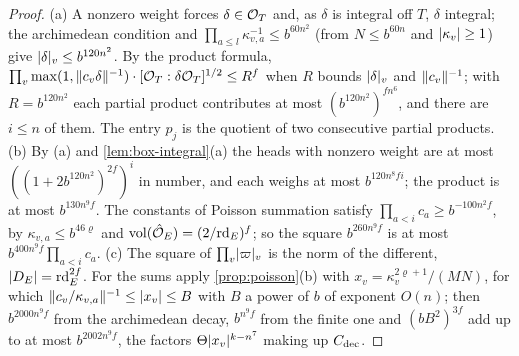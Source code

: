 \begin{proof}
(a) A nonzero weight forces $\delta\in\mathcal{O}_T$ and, as $\delta$ is integral off $T$, $\delta$ integral; the archimedean condition and $\prod_{a\le l}\kappa_{v,a}^{-1}\le b^{60n^2}$ (from $N\le b^{60n}$ and $\lvert \kappa_v\rvert\ge1$) give $\lvert \delta\rvert_v\le b^{120n^2}$. By the
product formula, $\prod_v\max(1,\lVert c_v\delta\rVert^{-1})\cdot[\mathcal{O}_T:\delta\mathcal{O}_T]^{1/2}\le R^f$ when $R$ bounds $\lvert \delta\rvert_v$ and $\lVert c_v\rVert^{-1}$; with $R=b^{120n^2}$ each partial product contributes at most $(b^{120n^2})^{fn^6}$, and there are $i\le n$ of
them. The entry $p_j$ is the quotient of two consecutive partial products. (b) By (a) and \cref{lem:box-integral}(a) the heads with nonzero weight are at most $((1+2b^{120n^2})^{2f})^{i}$ in number, and each weighs at most
$b^{120n^8fi}$; the product is at most $b^{130n^9f}$. The constants of Poisson summation satisfy $\prod_{a<i}c_a\ge b^{-100n^2f}$, by $\kappa_{v,a}\le b^{46\varrho}$ and $\operatorname{vol}(\hat{\mathcal{O}}_E)=(2/\mathrm{rd}_E)^f$; so the square $b^{260n^9f}$ is at most
$b^{400n^9f}\prod_{a<i}c_a$. (c) The square of $\prod_v\lvert \varpi\rvert_v$ is the norm of the different, $\lvert D_E\rvert=\mathrm{rd}_E^{2f}$. For the sums apply \cref{prop:poisson}(b) with $x_v=\kappa_v^{2\varrho+1}/(MN)$, for which $\lVert c_v/\kappa_{v,a}\rVert^{-1}\le\lvert x_v\rvert\le B$
with $B$ a power of $b$ of exponent $O(n)$; then $b^{2000n^9f}$ from the archimedean decay, $b^{n^9f}$ from the finite one and $(bB^2)^{3f}$ add up to at most $b^{2002n^9f}$, the factors $\Theta\lvert x_v\rvert^{k-n^7}$ making up $C_{\rm dec}$.
\end{proof}

